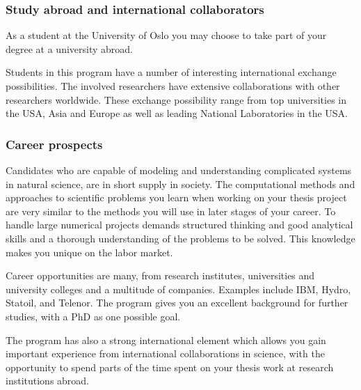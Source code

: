 \documentclass{beamer}
\begin{document}
\begin{frame}
\frametitle{Study abroad and international collaborators}

\begin{block}{}

As a student at the University of Oslo you may choose to take part of
your degree at a university abroad.

Students in this program have a number of interesting international
exchange possibilities. The involved researchers have extensive
collaborations with other researchers worldwide. These exchange
possibility range from top universities in the USA, Asia and Europe as
well as leading National Laboratories in the USA.  
\end{block}
\end{frame}

\begin{frame}
\frametitle{Career prospects}

\begin{block}{}
Candidates who are capable of modeling and understanding complicated
systems in natural science, are in short supply in society.  The
computational methods and approaches to scientific problems you learn
when working on your thesis project are very similar to the methods
you will use in later stages of your career.  To handle large
numerical projects demands structured thinking and good analytical
skills and a thorough understanding of the problems to be solved. This
knowledge makes you unique on the labor market.

Career opportunities are many, from research institutes, universities
and university colleges and a multitude of companies. Examples
include IBM, Hydro, Statoil, and Telenor.  The program gives you an
excellent background for further studies, with a PhD as one possible
goal.

The program has also a strong international element which allows you
gain important experience from international collaborations in
science, with the opportunity to spend parts of the time spent on your
thesis work at research institutions abroad.
\end{block}
\end{frame}
\end{document}
